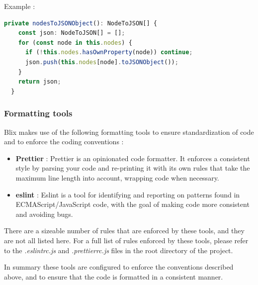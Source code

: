 \documentclass[11pt,a4paper]{article}
\begin{document}
Example :

\begin{lstlisting}[language=TypeScript]
private nodesToJSONObject(): NodeToJSON[] {
    const json: NodeToJSON[] = [];
    for (const node in this.nodes) {
      if (!this.nodes.hasOwnProperty(node)) continue;
      json.push(this.nodes[node].toJSONObject());
    }
    return json;
  }
\end{lstlisting}

\subsubsection*{Formatting tools}

Blix makes use of the following formatting tools to ensure standardization of code and to enforce the coding conventions : 
\begin{itemize}
    \item[\textbullet] \textbf{Prettier} : Prettier is an opinionated code formatter. It enforces a consistent style by parsing
    your code and re-printing it with its own rules that take the maximum line length into account, wrapping code when necessary.
    \item[\textbullet] \textbf{eslint} : Eslint is a tool for identifying and reporting on patterns found in ECMAScript/JavaScript code, 
    with the goal of making code more consistent and avoiding bugs.
\end{itemize}

There are a sizeable number of rules that are enforced by these tools, and they are not all listed here. 
For a full list of rules enforced by these tools, please refer to the \textit{.eslintrc.js} and \textit{.prettierrc.js} files in the 
root directory of the project.

In summary these tools are configured to enforce the conventions described above, and to ensure that the code is formatted in a consistent manner.

\pagebreak
\end{document}
